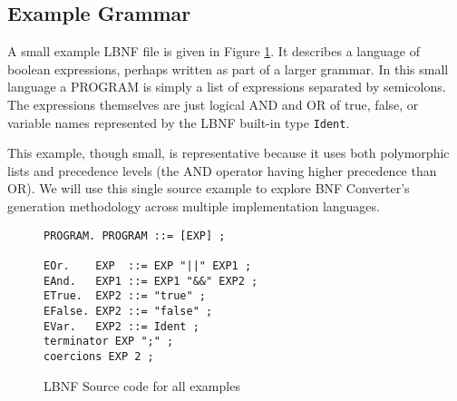 
\subsection{Example Grammar}

A small example LBNF file is given in Figure \ref{fig:source}. It describes a language of boolean expressions, perhaps written as part of a larger grammar. In this small language a PROGRAM is simply a list of expressions separated by semicolons. The expressions themselves are just logical AND and OR of true, false, or variable names represented by the LBNF built-in type \texttt{Ident}.

This example, though small, is representative because it uses both polymorphic lists and precedence levels (the AND operator having higher precedence than OR). We will use this single source example to explore BNF Converter's generation methodology across multiple implementation languages.

\begin{figure}
\begin{center}
\begin{boxedminipage}[t]{6.3cm}
\begin{verbatim}
PROGRAM. PROGRAM ::= [EXP] ;

EOr.    EXP  ::= EXP "||" EXP1 ;
EAnd.   EXP1 ::= EXP1 "&&" EXP2 ;
ETrue.  EXP2 ::= "true" ;
EFalse. EXP2 ::= "false" ;
EVar.   EXP2 ::= Ident ;
terminator EXP ";" ;
coercions EXP 2 ;
\end{verbatim}
\end{boxedminipage}
\end{center}
\caption{LBNF Source code for all examples}
\label{fig:source}
\end{figure}
